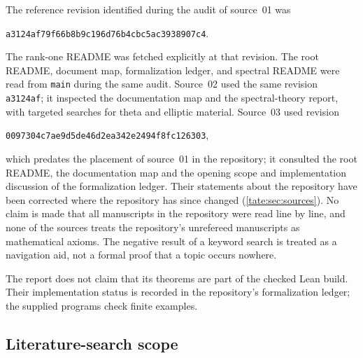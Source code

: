 \documentclass[11pt,letterpaper]{article}
\theoremstyle{definition}
\newcommand{\sha}{\texttt{a3124af79f66b8b9c196d76b4cbc5ac3938907c4}}
\newcommand{\shaN}{\texttt{0097304c7ae9d5de46d2ea342e2494f8fc126303}}
\begin{document}
The reference revision identified during the audit of source~01 was
\begin{center}\small\sha.\end{center}
The rank-one README was fetched explicitly at that revision. The root
README, document map, formalization ledger, and spectral README were
read from \texttt{main} during the same audit. Source~02 used the same
revision \texttt{a3124af}; it inspected the documentation map and the spectral-theory
report, with targeted searches for theta and elliptic material. Source~03
used revision
\begin{center}\small\shaN,\end{center}
which predates the placement of source~01 in the repository; it consulted
the root README, the documentation map and the opening scope and
implementation discussion of the formalization ledger. Their statements
about the repository have been corrected where the repository has since
changed (\cref{tate:sec:sources}). No claim is made that all manuscripts in
the repository were read line by line, and none of the sources treats the
repository's unrefereed manuscripts as mathematical axioms. The negative
result of a keyword search is treated as a navigation aid, not a formal
proof that a topic occurs nowhere.

The report does not claim that its theorems are part of the checked Lean
build. Their implementation status is recorded in the repository's
formalization ledger; the supplied programs check finite examples.

\subsection{Literature-search scope}
\end{document}

